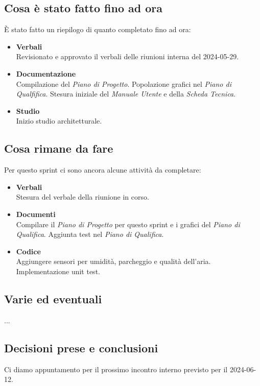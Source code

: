 \documentclass[italian,12pt]{article}
\begin{document}
\subsection{Cosa è stato fatto fino ad ora}
È stato fatto un riepilogo di quanto completato fino ad ora:
\begin{itemize}
	\item \textbf{Verbali} \\
	      Revisionato e approvato il verbali delle riunioni interna del 2024-05-29.
	\item \textbf{Documentazione} \\
	      Compilazione del \textit{Piano di Progetto}. Popolazione grafici nel \textit{Piano di Qualfifica}. Stesura iniziale del \textit{Manuale Utente} e della \textit{Scheda Tecnica}.
	\item \textbf{Studio} \\
		  Inizio studio architetturale.
\end{itemize}

\subsection{Cosa rimane da fare}
Per questo sprint ci sono ancora alcune attività da completare:
\begin{itemize}
	\item \textbf{Verbali} \\
		  Stesura del verbale della riunione in corso.
	\item \textbf{Documenti} \\
		  Compilare il \textit{Piano di Progetto} per questo sprint e i grafici del \textit{Piano di Qualifica}. Aggiunta test nel \textit{Piano di Qualifica}.  
	\item \textbf{Codice} \\
		  Aggiungere sensori per umidità, parcheggio e qualità dell'aria. Implementazione unit test.
\end{itemize}

\subsection{Varie ed eventuali}
...

\subsection{Decisioni prese e conclusioni}
Ci diamo appuntamento per il prossimo incontro interno previsto per il 2024-06-12.
\end{document}
